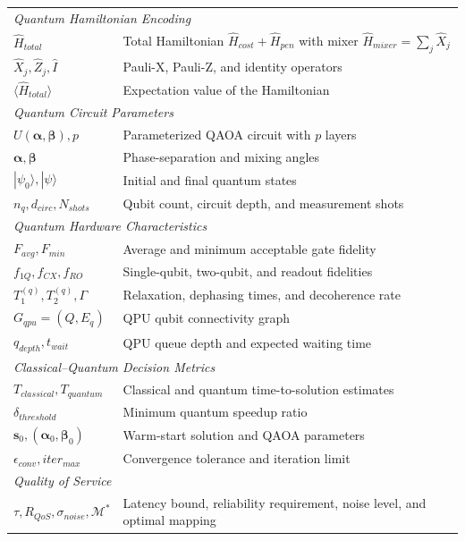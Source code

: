 \documentclass[lettersize,journal]{IEEEtran}
\begin{document}
\begin{table}[t]
\begin{tabular}{p{3.2cm}p{5cm}}
\hline
\multicolumn{2}{l}{\textit{Quantum Hamiltonian Encoding}} \\
$\hat{H}_{total}$ &
Total Hamiltonian $\hat{H}_{cost}+\hat{H}_{pen}$ with mixer $\hat{H}_{mixer}=\sum_j\hat{X}_j$ \\
$\hat{X}_j,\hat{Z}_j,\hat{I}$ &
Pauli-X, Pauli-Z, and identity operators \\
$\langle \hat{H}_{total} \rangle$ &
Expectation value of the Hamiltonian \\

\hline
\multicolumn{2}{l}{\textit{Quantum Circuit Parameters}} \\
$U(\boldsymbol{\alpha},\boldsymbol{\beta}),p$ &
Parameterized QAOA circuit with $p$ layers \\
$\boldsymbol{\alpha},\boldsymbol{\beta}$ &
Phase-separation and mixing angles \\
$|\psi_0\rangle,|\psi\rangle$ &
Initial and final quantum states \\
$n_q,d_{circ},N_{shots}$ &
Qubit count, circuit depth, and measurement shots \\

\hline
\multicolumn{2}{l}{\textit{Quantum Hardware Characteristics}} \\
$F_{avg},F_{min}$ &
Average and minimum acceptable gate fidelity \\
$f_{1Q},f_{CX},f_{RO}$ &
Single-qubit, two-qubit, and readout fidelities \\
$T_1^{(q)},T_2^{(q)},\Gamma$ &
Relaxation, dephasing times, and decoherence rate \\
$G_{qpu}=(Q,E_q)$ &
QPU qubit connectivity graph \\
$q_{depth},t_{wait}$ &
QPU queue depth and expected waiting time \\

\hline
\multicolumn{2}{l}{\textit{Classical--Quantum Decision Metrics}} \\
$T_{classical},T_{quantum}$ &
Classical and quantum time-to-solution estimates \\
$\delta_{threshold}$ &
Minimum quantum speedup ratio \\
$\mathbf{s}_0,(\boldsymbol{\alpha}_0,\boldsymbol{\beta}_0)$ &
Warm-start solution and QAOA parameters \\
$\epsilon_{conv},iter_{max}$ &
Convergence tolerance and iteration limit \\

\hline
\multicolumn{2}{l}{\textit{Quality of Service}} \\
$\tau,R_{QoS},\sigma_{noise},\mathcal{M}^*$ &
Latency bound, reliability requirement, noise level, and optimal mapping \\

\hline
\end{tabular}
\end{table}
\end{document}
